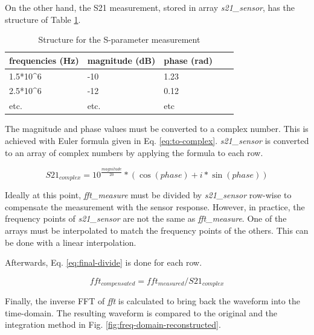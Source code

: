 On the other hand, the S21 measurement, stored in array \textit{s21\_sensor}, has the structure of Table \ref{tab:sparams}.

\begin{table}[!htbp]
  \centering
  \begin{tabular}{@{}lllll@{}}
  \toprule
  frequencies (Hz)          & magnitude (dB)         & phase (rad)     \\ \midrule
  1.5*10^6                  & -10                    & 1.23            \\
  2.5*10^6                  & -12                    & 0.12            \\
  etc.                      & etc.                   & etc             \\ \bottomrule
  \end{tabular}
  \caption{Structure for the S-parameter measurement}
  \label{tab:sparams}
\end{table}

The magnitude and phase values must be converted to a complex number.
This is achieved with Euler formula given in Eq. \ref{eq:to-complex}.
\textit{s21\_sensor} is converted to an array of complex numbers by applying the formula to each row.

\begin{equation} \label{eq:to-complex}
  S21_{complex} = 10^{\frac{magnitude}{20}} * (\cos(phase) + i*\sin(phase))
\end{equation}

Ideally at this point, \textit{fft\_measure} must be divided by \textit{s21\_sensor} row-wise to compensate the measurement with the sensor response.
However, in practice, the frequency points of \textit{s21\_sensor} are not the same as \textit{fft\_measure}.
One of the arrays must be interpolated to match the frequency points of the others.
This can be done with a linear interpolation.

Afterwards, Eq. \ref{eq:final-divide} is done for each row.

\begin{equation} \label{eq:final-divide}
  fft_{compensated} = fft_{measured} / S21_{complex}
\end{equation}

Finally, the inverse FFT of \textit{fft\compensated} is calculated to bring back the waveform into the time-domain.
The resulting waveform is compared to the original and the integration method in Fig. \ref{fig:freq-domain-reconstructed}.

